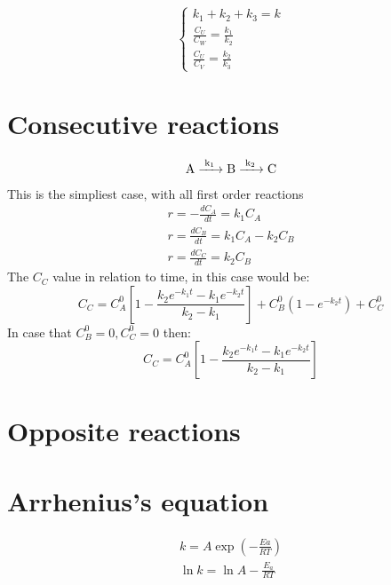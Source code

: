 \documentclass[Master.tex]{subfiles}
\begin{document}
\begin{multicols}{2}
		  \begin{equation*}
				   \begin{cases}
						    k_{1} + k_{2} + k_{3} = k                  \\
						    \frac{C_{U}}{C_{W} } = \frac{k_{1}}{k_{2}} \\
						    \frac{C_{U} }{C_{V}} = \frac{k_{2}}{k_{3}}
				   \end{cases}
		  \end{equation*}

		 \section{Consecutive reactions}
		  \begin{gather*}
				   \ce{ A ->[{k_{1}}] B ->[{k_{2}}]C}\\
		  \end{gather*}
		  This is the simpliest case, with all first order reactions
		  \begin{gather*}
				   r = -\frac{dC_{A}}{dt} = k_{1}C_{A}\\
				   r = \frac{dC_{B}}{dt} = k_{1}C_{A} - k_{2}C_{B}\\
				   r = \frac{dC_{C}}{dt} = k_{2}C_{B}
		  \end{gather*}
		  The $C_{C}$ value in relation to time, in this case would be:
		  \[
				   C_{C} = C_{A}^{0}\left[1 -\frac{k_{2}e^{-k_{1}t} -k_{1}e^{-k_{2}t}}{k_{2}-k_{1}} \right] + C_{B}^{0}(1-e^{-k_{2}t})+C_{C}^{0}
		  \]
		  In case that \( C_{B}^0=0, C_{C}^0 = 0 \) then:
		  \[
				   C_{C} = C_{A}^{0}\left[1 -\frac{k_{2}e^{-k_{1}t} -k_{1}e^{-k_{2}t}}{k_{2}-k_{1}} \right]
		  \]
		 \section{Opposite reactions}

		 \section{Arrhenius's equation}
		  \begin{gather*}
				   k = A \exp \left( -\frac{Ea}{RT} \right)\\
				   \ln k = \ln A - \frac{E_{a}}{RT}
		  \end{gather*}
\end{multicols}
\end{document}
